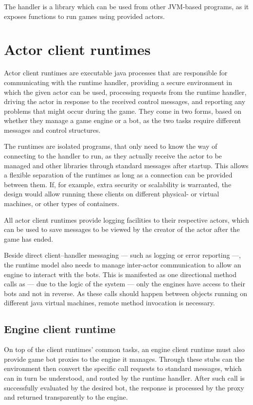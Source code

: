 	The handler is a library which can be used from other JVM-based programs, as it exposes functions to run games using provided actors.
	
	\section{Actor client runtimes}
	
	Actor client runtimes are executable java processes that are responsible for communicating with the runtime handler, providing a secure environment in which the given actor can be used, processing requests from the runtime handler, driving the actor in response to the received control messages, and reporting any problems that might occur during the game.
	They come in two forms, based on whether they manage a game engine or a bot, as the two tasks require different messages and control structures.

	 The runtimes are isolated programs, that only need to know the way of connecting to the handler to run, as they actually receive the actor to be managed and other libraries through standard messages after startup. This allows a flexible separation of the runtimes as long as a connection can be provided between them. If, for example, extra security or scalability is warranted, the design would allow running these clients on different physical- or virtual machines, or other types of containers.
	
	All actor client runtimes provide logging facilities to their respective actors, which can be used to save messages to be viewed by the creator of the actor after the game has ended.
	
	Beside direct client--handler messaging --- such as logging or error reporting ---, the runtime model also needs to manage inter-actor communication to allow an engine to interact with the bots. This is manifested as one directional method calls as --- due to the logic of the system --- only the engines have access to their bots and not in reverse.
	As these calls should happen between objects running on different java virtual machines, remote method invocation is necessary.
	
		\subsection*{Engine client runtime}
	
		On top of the client runtimes' common tasks, an engine client runtime must also provide game bot proxies to the engine it manages. Through these stubs can the environment then convert the specific call requests to standard messages, which can in turn be understood, and routed by the runtime handler. After such call is successfully evaluated by the desired bot, the response is processed by the proxy and returned transparently to the engine.
	
